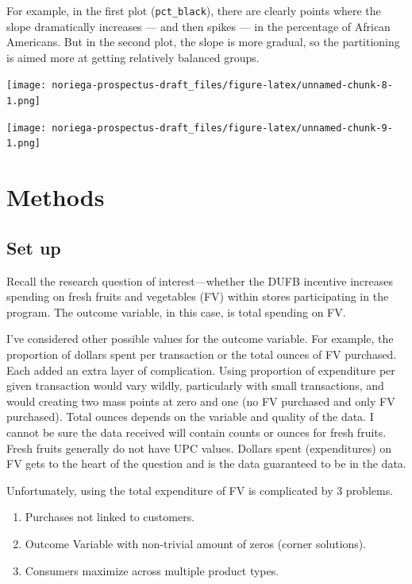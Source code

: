 \documentclass[12pt,letterpaperpaper,]{book}
\providecommand{\tightlist}{%
  \setlength{\itemsep}{0pt}\setlength{\parskip}{0pt}}
\begin{document}
For example, in the first plot (\texttt{pct\_black}), there are clearly
points where the slope dramatically increases --- and then spikes --- in
the percentage of African Americans. But in the second plot, the slope
is more gradual, so the partitioning is aimed more at getting relatively
balanced groups.

\texttt{[image: noriega-prospectus-draft\_files/figure-latex/unnamed-chunk-8-1.png]}

\texttt{[image: noriega-prospectus-draft\_files/figure-latex/unnamed-chunk-9-1.png]}

\hypertarget{methods-1}{\section*{Methods}\label{methods-1}}

\subsection*{Set up}\label{set-up}

Recall the research question of interest---whether the DUFB incentive
increases spending on fresh fruits and vegetables (FV) within stores
participating in the program. The outcome variable, in this case, is
total spending on FV.

I've considered other possible values for the outcome variable. For
example, the proportion of dollars spent per transaction or the total
ounces of FV purchased. Each added an extra layer of complication. Using
proportion of expenditure per given transaction would vary wildly,
particularly with small transactions, and would creating two mass points
at zero and one (no FV purchased and only FV purchased). Total ounces
depends on the variable and quality of the data. I cannot be sure the
data received will contain counts or ounces for fresh fruits. Fresh
fruits generally do not have UPC values. Dollars spent (expenditures) on
FV gets to the heart of the question and is the data guaranteed to be in
the data.

Unfortunately, using the total expenditure of FV is complicated by 3
problems.

\begin{enumerate}
\def\labelenumi{\arabic{enumi}.}
\tightlist
\item
  Purchases not linked to customers.
\item
  Outcome Variable with non-trivial amount of zeros (corner solutions).
\item
  Consumers maximize across multiple product types.
\end{enumerate}
\end{document}
